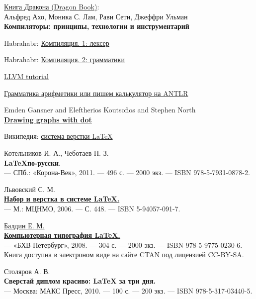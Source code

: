 
\begin{thebibliography}{99}


\href{https://drive.google.com/file/d/0B0u4WeMjO894LS1Jb3JUbEVSVkE/view?usp=sharing}{Книга Дракона (Dragon Book)}:\\
Альфред Ахо, Моника С. Лам, Рави Сети, Джеффри Ульман\\
\textbf{Компиляторы: принципы, технологии и инструментарий}


 Habrahabr: \href{http://habrahabr.ru/post/99162/}{Компиляция. 1: лексер}

 Habrahabr: \href{http://habrahabr.ru/post/99298/}{Компиляция. 2: грамматики}


 \href{http://llvm.org/docs/tutorial/}{LLVM tutorial}


 \href{http://habrahabr.ru/post/110710/}{Грамматика 
арифметики или пишем калькулятор на ANTLR}


Emden Gansner and Eleftherios Koutsofios and Stephen North\\
\textbf{\href{http://www.graphviz.org/Documentation/dotguide.pdf}{Drawing graphs with dot}}


 Википедия:
\href{https://ru.wikipedia.org/wiki/LaTeX}{система верстки \LaTeX}

Котельников И. А., Чеботаев П. З.\\ 
\textbf{\LaTeX по-русски}.\\
— СПб.: «Корона-Век», 2011. — 496 с. — 2000 экз. — ISBN 978-5-7931-0878-2.

Львовский С. М.\\
\href{http://www.mccme.ru/free-books/llang/newllang.pdf}{\textbf{Набор и верстка в системе LaTeX.}}\\
— М.: МЦНМО, 2006. — С. 448. — ISBN 5-94057-091-7.

\href{http://www.inp.nsk.su/~baldin/LaTeX/}{Балдин Е. М.}\\
\href{http://mirrors.ctan.org/info/russian/Computer_Typesetting_Using_LaTeX/ctex.pdf}{\textbf{Компьютерная типография LaTeX.}}\\
 — «БХВ-Петербург», 2008. — 304 с. — 2000 экз. — ISBN 978-5-9775-0230-6. Книга доступна в электроном виде на сайте CTAN под лицензией CC-BY-SA.

Столяров А. В.\\
\textbf{Сверстай диплом красиво: LaTeX за три дня.}\\
 — Москва: МАКС Пресс, 2010. — 100 с. — 200 экз. — ISBN 978-5-317-03440-5.

\end{thebibliography}